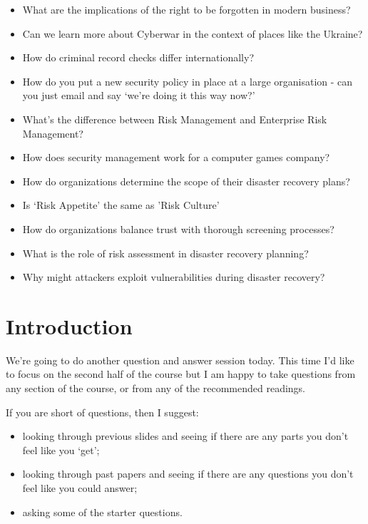 \documentclass[12pt]{article}
\begin{document}
\begin{itemize}
  \item What are the implications of the right to be forgotten in modern business?
  \item Can we learn more about Cyberwar in the context of places like the Ukraine?
  \item How do criminal record checks differ internationally?
  \item How do you put a new security policy in place at a large organisation - can you just email and say `we're doing it this way now?'
  \item What's the difference between Risk Management and Enterprise Risk Management?
  \item How does security management work for a computer games company?
  \item How do organizations determine the scope of their disaster recovery plans?
  \item Is `Risk Appetite' the same as 'Risk Culture'
  \item How do organizations balance trust with thorough screening processes?
  \item What is the role of risk assessment in disaster recovery planning?
  \item Why might attackers exploit vulnerabilities during disaster recovery?
\end{itemize}


%
%



\maketitle

\section*{Introduction}
We're going to do another question and answer session today. This time I'd like to focus on the second half of the course but I am happy to take questions from any section of the course, or from any of the recommended readings. 

If you are short of questions, then I suggest: 

\begin{itemize} 
\item looking through previous slides and seeing if there are any parts you don't feel like you `get';
\item looking through past papers and seeing if there are any questions you don't feel like you could answer;
\item asking some of the starter questions.
\end{itemize} 
\end{document}
